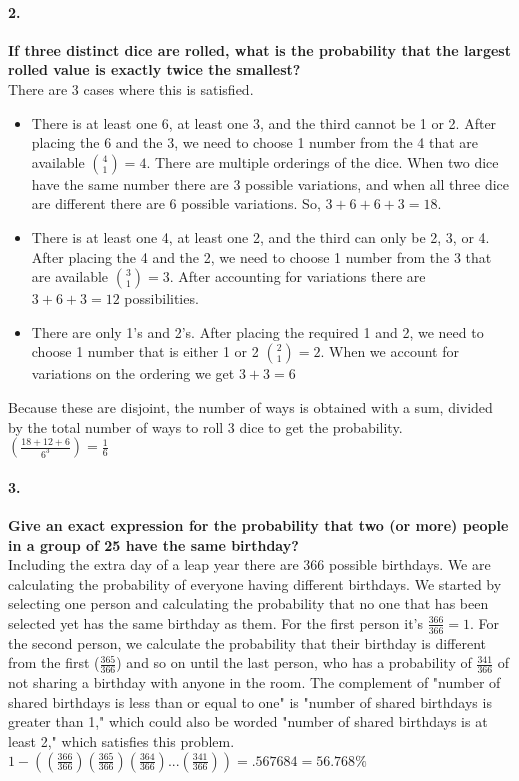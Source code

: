 \documentclass{article}
\begin{document}
\paragraph{2. }
\textbf{If three distinct dice are rolled, what is the probability that the 
largest rolled value is exactly twice the smallest?}\\
There are 3 cases where this is satisfied.
\begin{itemize}
\item There is at least one 6, at least one 3, and the third cannot be 1 or 2. 
After placing the 6 and the 3, we need to choose 1 number from the 4 that are 
available ${4 \choose 1} = 4$. There are multiple orderings of the dice. When 
two dice have the same number there are 3 possible variations, and when all 
three dice are different there are 6 possible variations. So, 
${3 + 6 + 6 + 3 = 18}$.
\item There is at least one 4, at least one 2, and the third can only be 2, 3, 
or 4. After placing the 4 and the 2, we need to choose 1 number from the 3 that 
are available ${3 \choose 1} = 3$. After accounting for variations there are 
${3 + 6 + 3 = 12}$ possibilities.
\item There are only 1's and 2's. After placing the required 1 and 2, we need to 
choose 1 number that is either 1 or 2 ${2 \choose 1} = 2$. When we account for 
variations on the ordering we get ${3 + 3 = 6}$
\end{itemize}
Because these are disjoint, the number of ways is obtained with a sum, divided 
by the total number of ways to roll 3 dice to get the probability.\\
$\boxed{\left( \frac{18+12+6}{6^3} \right) = \frac{1}{6}}$

\pagebreak

\paragraph{3. }
\textbf{Give an exact expression for the probability that two (or more) people 
in a group of 25 have the same birthday?}\\
Including the extra day of a leap year there are 366 possible birthdays. We are 
calculating the probability of everyone having different birthdays. We started 
by selecting one person and calculating the probability that no one that has 
been selected yet has the same birthday as them. For the first person it's 
$\frac{366}{366} = 1$. For the second person, we calculate the probability that 
their birthday is different from the first ($\frac{365}{366}$) and so on until 
the last person, who has a probability of $\frac{341}{366}$ of not sharing a 
birthday with anyone in the room. The complement of "number of shared birthdays 
is less than or equal to one" is "number of shared birthdays is greater than 1," 
which could also be worded "number of shared birthdays is at least 2," which 
satisfies this problem.\\
$\boxed{1 - ((\frac{366}{366}) (\frac{365}{366}) (\frac{364}{366}) ... 
(\frac{341}{366})) = .567684 = 56.768\%}$
\end{document}
